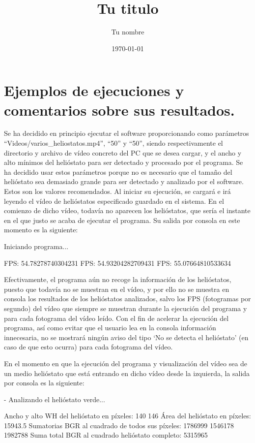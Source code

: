 \documentclass[12pt]{article}
\title{Tu titulo}					%
\author{Tu nombre}					%
\date{\today}						%
\begin{document}
\tableofcontents
\pagebreak


\section{Ejemplos de ejecuciones y comentarios sobre sus resultados.}

Se ha decidido en principio ejecutar el software proporcionando como parámetros “Videos/varios\_heliostatos.mp4”, “50” y “50”, siendo respectivamente el directorio y archivo de vídeo concreto del PC que se desea cargar, y el ancho y alto mínimos del helióstato para ser detectado y procesado por el programa. Se ha decidido usar estos parámetros porque no es necesario que el tamaño del helióstato sea demasiado grande para ser detectado y analizado por el software. Estos son los valores recomendados. Al iniciar su ejecución, se cargará e irá leyendo el vídeo de helióstatos especificado guardado en el sistema. En el comienzo de dicho vídeo, todavía no aparecen los helióstatos, que sería el instante en el que justo se acaba de ejecutar el programa. Su salida por consola en este momento es la siguiente:
 
Iniciando programa...

FPS: 54.78278740304231
FPS: 54.93204282709431
FPS: 55.07664810533634

Efectivamente, el programa aún no recoge la información de los helióstatos, puesto que todavía no se muestran en el vídeo, y por ello no se muestra en consola los resultados de los helióstatos analizados, salvo los FPS (fotogramas por segundo) del vídeo que siempre se muestran durante la ejecución del programa y para cada fotograma del vídeo leído. Con el fin de acelerar la ejecución del programa, así como evitar que el usuario lea en la consola información innecesaria, no se mostrará ningún aviso del tipo ‘No se detecta el helióstato’ (en caso de que esto ocurra) para cada fotograma del vídeo.

En el momento en que la ejecución del programa y visualización del vídeo sea de un medio helióstato que está entrando en dicho vídeo desde la izquierda, la salida por consola es la siguiente:

- Analizando el helióstato verde...

Ancho y alto WH del helióstato en píxeles:        140  146
Área del helióstato en píxeles:                   15943.5
Sumatorias BGR al cuadrado de todos sus píxeles:  1786999  1546178  1982788
Suma total BGR al cuadrado helióstato completo:   5315965
\end{document}
